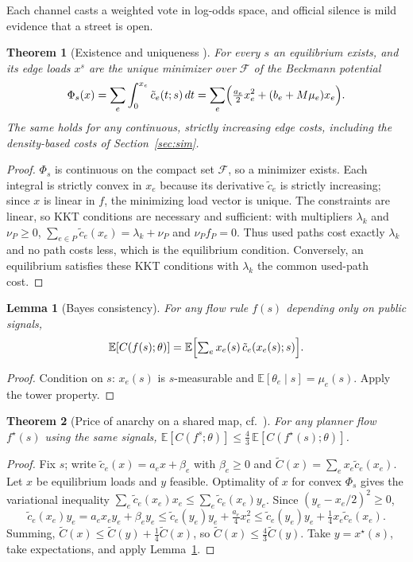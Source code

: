 \documentclass[11pt]{article}
\newtheorem{theorem}{Theorem}
\newtheorem{lemma}{Lemma}
\theoremstyle{definition}
\theoremstyle{remark}
\newcommand{\E}{\mathbb{E}}
\newcommand{\1}{\mathbf{1}}
\begin{document}
Each channel casts a weighted vote in log-odds space, and official silence
is mild evidence that a street is open.

\begin{theorem}[Existence and uniqueness \cite{beck}]\label{thm:exist}
For every $s$ an equilibrium exists, and its edge loads $x^s$ are the
unique minimizer over $\mathcal F$ of the Beckmann potential
\[
\Phi_s(x)=\sum_e\int_0^{x_e}\tilde c_e(t;s)\,dt
=\sum_e\Bigl(\tfrac{a_e}{2}x_e^2+(b_e+M\mu_e)x_e\Bigr).
\]
The same holds for any continuous, strictly increasing edge costs,
including the density-based costs of Section~\ref{sec:sim}.
\end{theorem}

\begin{proof}
$\Phi_s$ is continuous on the compact set $\mathcal F$, so a minimizer
exists. Each integral is strictly convex in $x_e$ because its derivative
$\tilde c_e$ is strictly increasing; since $x$ is linear in $f$, the
minimizing load vector is unique. The constraints are linear, so KKT
conditions are necessary and sufficient: with multipliers $\lambda_k$ and
$\nu_P\ge0$, $\sum_{e\in P}\tilde c_e(x_e)=\lambda_k+\nu_P$ and
$\nu_Pf_P=0$. Thus used paths cost exactly $\lambda_k$ and no path costs
less, which is the equilibrium condition. Conversely, an equilibrium
satisfies these KKT conditions with $\lambda_k$ the common used-path cost.
\end{proof}

\begin{lemma}[Bayes consistency]\label{lem:consistency}
For any flow rule $f(s)$ depending only on public signals,
\[
\E[C(f(s);\theta)]=\E\Bigl[\textstyle\sum_ex_e(s)\,\tilde c_e(x_e(s);s)\Bigr].
\]
\end{lemma}

\begin{proof}
Condition on $s$: $x_e(s)$ is $s$-measurable and
$\E[\theta_e\mid s]=\mu_e(s)$. Apply the tower property.
\end{proof}

\begin{theorem}[Price of anarchy on a shared map, cf.\ \cite{rt}]\label{thm:poa}
For any planner flow $f^\star(s)$ using the same signals,
$\E[C(f^s;\theta)]\le\tfrac43\,\E[C(f^\star(s);\theta)]$.
\end{theorem}

\begin{proof}
Fix $s$; write $\tilde c_e(x)=a_ex+\beta_e$ with $\beta_e\ge0$ and
$\tilde C(x)=\sum_ex_e\tilde c_e(x_e)$. Let $x$ be equilibrium loads and $y$
feasible. Optimality of $x$ for convex $\Phi_s$ gives the variational
inequality $\sum_e\tilde c_e(x_e)x_e\le\sum_e\tilde c_e(x_e)y_e$. Since
$(y_e-x_e/2)^2\ge0$,
\[
\tilde c_e(x_e)y_e=a_ex_ey_e+\beta_ey_e\le\tilde c_e(y_e)y_e+\tfrac{a_e}{4}x_e^2
\le\tilde c_e(y_e)y_e+\tfrac14x_e\tilde c_e(x_e).
\]
Summing, $\tilde C(x)\le\tilde C(y)+\tfrac14\tilde C(x)$, so
$\tilde C(x)\le\tfrac43\tilde C(y)$. Take $y=x^\star(s)$, take expectations,
and apply Lemma~\ref{lem:consistency}.
\end{proof}
\end{document}
